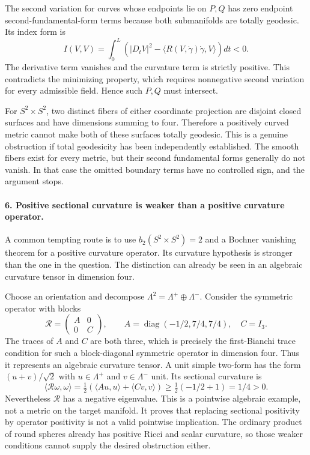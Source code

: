 \documentclass[11pt]{article}
\begin{document}
The second variation for curves whose endpoints lie on $P,Q$ has zero endpoint second-fundamental-form terms because both submanifolds are totally geodesic. Its index form is
\[
 I(V,V)=\int_0^L\left(|D_tV|^2
 -\langle R(V,\dot\gamma)\dot\gamma,V\rangle\right)dt<0.
\]
The derivative term vanishes and the curvature term is strictly positive. This contradicts the minimizing property, which requires nonnegative second variation for every admissible field. Hence such $P,Q$ must intersect.

For $S^2\times S^2$, two distinct fibers of either coordinate projection are disjoint closed surfaces and have dimensions summing to four. Therefore a positively curved metric cannot make both of these surfaces totally geodesic. This is a genuine obstruction if total geodesicity has been independently established. The smooth fibers exist for every metric, but their second fundamental forms generally do not vanish. In that case the omitted boundary terms have no controlled sign, and the argument stops.

\paragraph{6. Positive sectional curvature is weaker than a positive curvature operator.}
A common tempting route is to use $b_2(S^2\times S^2)=2$ and a Bochner vanishing theorem for a positive curvature operator. Its curvature hypothesis is stronger than the one in the question. The distinction can already be seen in an algebraic curvature tensor in dimension four.

Choose an orientation and decompose $\Lambda^2=\Lambda^+\oplus\Lambda^-$. Consider the symmetric operator with blocks
\[
 \mathcal R=\begin{pmatrix}A&0\\0&C\end{pmatrix},
 \qquad A=\operatorname{diag}(-1/2,7/4,7/4),\quad C=I_3.
\]
The traces of $A$ and $C$ are both three, which is precisely the first-Bianchi trace condition for such a block-diagonal symmetric operator in dimension four. Thus it represents an algebraic curvature tensor. A unit simple two-form has the form $(u+v)/\sqrt2$ with $u\in\Lambda^+$ and $v\in\Lambda^-$ unit. Its sectional curvature is
\[
 \langle\mathcal R\omega,\omega\rangle
 =\tfrac12(\langle Au,u\rangle+\langle Cv,v\rangle)
 \geq\tfrac12(-1/2+1)=1/4>0.
\]
Nevertheless $\mathcal R$ has a negative eigenvalue. This is a pointwise algebraic example, not a metric on the target manifold. It proves that replacing sectional positivity by operator positivity is not a valid pointwise implication. The ordinary product of round spheres already has positive Ricci and scalar curvature, so those weaker conditions cannot supply the desired obstruction either.
\end{document}
